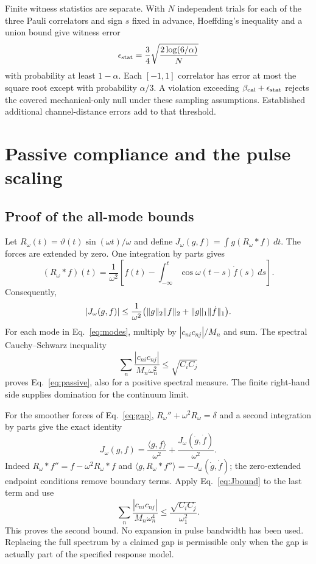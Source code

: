 Finite witness statistics are separate. With $N$ independent trials for each of the three Pauli correlators and sign $s$ fixed in advance, Hoeffding's inequality and a union bound give witness error
\begin{equation}
\epsilon_{\rm stat}=\frac34\sqrt{\frac{2\log(6/\alpha)}N}
\label{eq:statistics}
\end{equation}
with probability at least $1-\alpha$. Each $[-1,1]$ correlator has error at most the square root except with probability $\alpha/3$. A violation exceeding $\beta_{\rm cal}+\epsilon_{\rm stat}$ rejects the covered mechanical-only null under these sampling assumptions. Established additional channel-distance errors add to that threshold.

\section{Passive compliance and the pulse scaling}\label{app:passive}
\subsection{Proof of the all-mode bounds}
Let $R_\omega(t)=\vartheta(t)\sin(\omega t)/\omega$ and define $J_\omega(g,f)=\int g(R_\omega*f)\,dt$. The forces are extended by zero. One integration by parts gives
\begin{equation}
(R_\omega*f)(t)=\frac1{\omega^2}\left[f(t)-\int_{-\infty}^t\cos\omega(t-s)\dot f(s)\,ds\right].
\label{eq:parts1}
\end{equation}
Consequently,
\begin{equation}
|J_\omega(g,f)|\le\frac1{\omega^2}\bigl(\norm g_2\norm f_2+\norm g_1\norm{\dot f}_1\bigr).
\label{eq:Jbound}
\end{equation}
For each mode in Eq.~\eqref{eq:modes}, multiply by $|c_{ni}c_{nj}|/M_n$ and sum. The spectral Cauchy--Schwarz inequality
\begin{equation}
\sum_n\frac{|c_{ni}c_{nj}|}{M_n\omega_n^2}\le\sqrt{C_iC_j}
\label{eq:spectralCS}
\end{equation}
proves Eq.~\eqref{eq:passive}, also for a positive spectral measure. The finite right-hand side supplies domination for the continuum limit.

For the smoother forces of Eq.~\eqref{eq:gap}, $R_\omega''+\omega^2R_\omega=\delta$ and a second integration by parts give the exact identity
\begin{equation}
J_\omega(g,f)=\frac{\langle g,f\rangle}{\omega^2}
+\frac{J_\omega(\dot g,\dot f)}{\omega^2}.
\label{eq:Jidentity}
\end{equation}
Indeed $R_\omega*f''=f-\omega^2R_\omega*f$ and $\langle g,R_\omega*f''\rangle=-J_\omega(\dot g,\dot f)$; the zero-extended endpoint conditions remove boundary terms. Apply Eq.~\eqref{eq:Jbound} to the last term and use
\begin{equation}
\sum_n\frac{|c_{ni}c_{nj}|}{M_n\omega_n^4}\le\frac{\sqrt{C_iC_j}}{\omega_1^2}.
\label{eq:gapCS}
\end{equation}
This proves the second bound. No expansion in pulse bandwidth has been used. Replacing the full spectrum by a claimed gap is permissible only when the gap is actually part of the specified response model.

